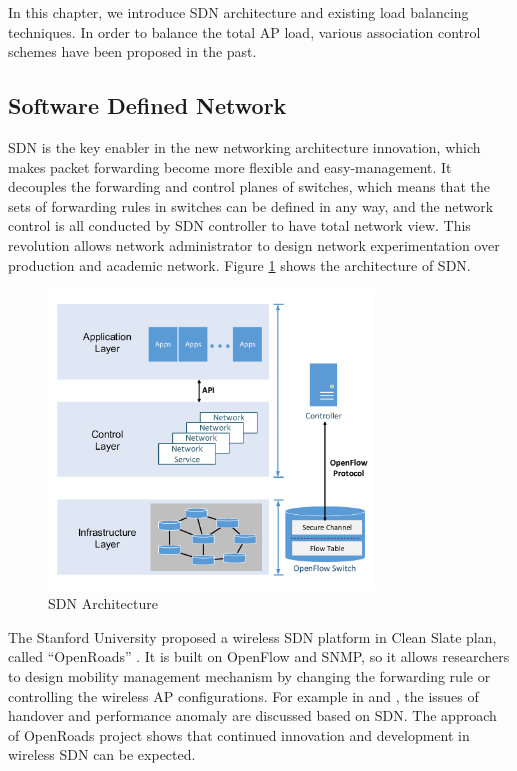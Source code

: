In this chapter, we introduce SDN architecture and existing load balancing techniques. In order to balance the total AP load, various association control schemes have been proposed in the past.

\subsection{Software Defined Network}
SDN\cite{mckeown2008openflow} is the key enabler in the new networking architecture innovation, which makes packet forwarding become more flexible and easy-management. It decouples the forwarding and control planes of switches, which means that the sets of forwarding rules in switches can be defined in any way, and the network control is all conducted by SDN controller to have total network view. This revolution allows network administrator to design network experimentation over production and academic network. Figure \ref{fig:SDN-Architecture} shows the architecture of SDN.

\begin{figure}[tbp]
\begin{center}
\includegraphics[width=3.4in]{images/SDN_architecture.pdf}
\end{center}
\caption{SDN Architecture}
\label{fig:SDN-Architecture}
\end{figure}

The Stanford University proposed a wireless SDN platform in Clean Slate plan, called “OpenRoads” \cite{yap2010openroads}. It is built on OpenFlow and SNMP, so it allows researchers to design mobility management mechanism by changing the forwarding rule or controlling the wireless AP configurations. For example in \cite{kim2014seamless} and \cite{dely2013software}, the issues of handover and performance anomaly are discussed based on SDN. The approach of OpenRoads project shows that continued innovation and development in wireless SDN can be expected.



